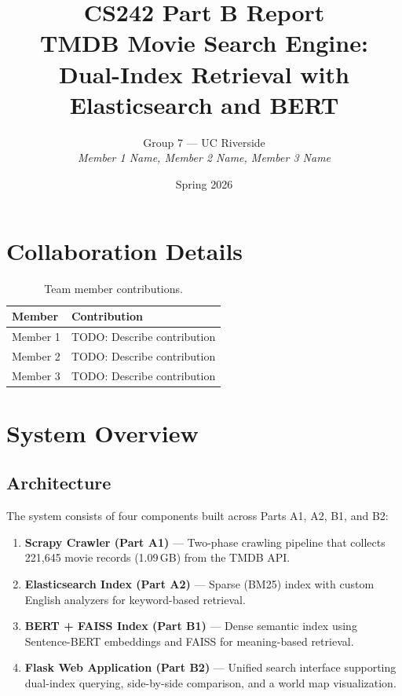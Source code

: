 \documentclass[11pt,a4paper]{article}
\title{
  \textbf{CS242 Part B Report} \\[6pt]
  \Large TMDB Movie Search Engine: \\
  Dual-Index Retrieval with Elasticsearch and BERT
}
\author{
  Group 7 --- UC Riverside \\[4pt]
  \textit{Member 1 Name, Member 2 Name, Member 3 Name}
}
\date{Spring 2026}
\begin{document}
\maketitle
\thispagestyle{fancy}

\section{Collaboration Details}

\begin{table}[H]
\centering
\begin{tabular}{@{}lp{10cm}@{}}
\toprule
\textbf{Member} & \textbf{Contribution} \\
\midrule
Member 1 & TODO: Describe contribution \\
Member 2 & TODO: Describe contribution \\
Member 3 & TODO: Describe contribution \\
\bottomrule
\end{tabular}
\caption{Team member contributions.}
\end{table}

\section{System Overview}

\subsection{Architecture}

The system consists of four components built across Parts A1, A2, B1, and B2:

\begin{enumerate}[nosep]
  \item \textbf{Scrapy Crawler (Part A1)} --- Two-phase crawling pipeline that collects 221,645 movie records (1.09\,GB) from the TMDB API.
  \item \textbf{Elasticsearch Index (Part A2)} --- Sparse (BM25) index with custom English analyzers for keyword-based retrieval.
  \item \textbf{BERT + FAISS Index (Part B1)} --- Dense semantic index using Sentence-BERT embeddings and FAISS for meaning-based retrieval.
  \item \textbf{Flask Web Application (Part B2)} --- Unified search interface supporting dual-index querying, side-by-side comparison, and a world map visualization.
\end{enumerate}
\end{document}
